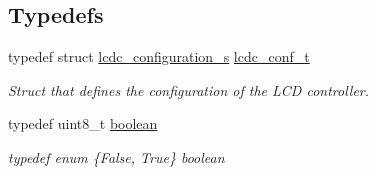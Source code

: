 \subsection*{Typedefs}
\begin{CompactItemize}
\item 
\hypertarget{group__ap7000__lcd_g73bd598b8ec465e0962110c640cd7a65}{
typedef struct \hyperlink{structlcdc__configuration__s}{lcdc\_\-configuration\_\-s} \hyperlink{group__ap7000__lcd_g73bd598b8ec465e0962110c640cd7a65}{lcdc\_\-conf\_\-t}}
\label{group__ap7000__lcd_g73bd598b8ec465e0962110c640cd7a65}

\begin{CompactList}\small\item\em Struct that defines the configuration of the LCD controller. \item\end{CompactList}\item 
\hypertarget{group__ap7000__lcd_g9c639bd343606632b938f16f4adf516a}{
typedef uint8\_\-t \hyperlink{group__ap7000__lcd_g9c639bd343606632b938f16f4adf516a}{boolean}}
\label{group__ap7000__lcd_g9c639bd343606632b938f16f4adf516a}

\begin{CompactList}\small\item\em typedef enum \{False, True\} boolean \item\end{CompactList}\end{CompactItemize}

